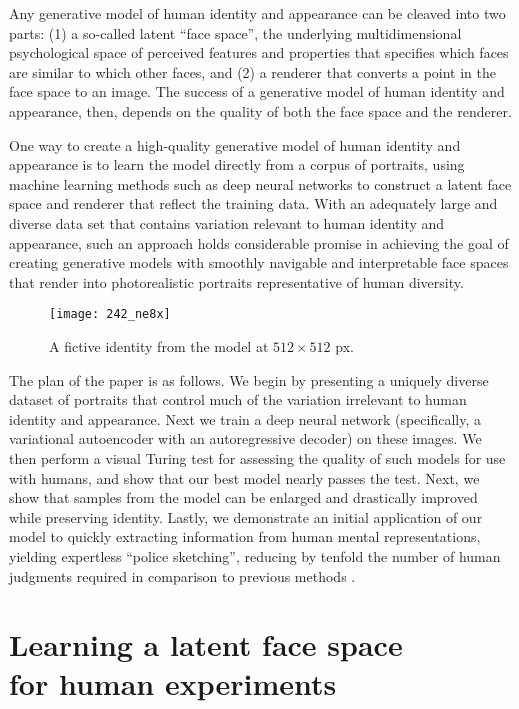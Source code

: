 \documentclass[10pt,letterpaper]{article}
\begin{document}
Any generative model of human identity and appearance can be cleaved into two parts: (1) a so-called latent ``face space'', the underlying  multidimensional psychological space of perceived features and properties that specifies which faces are similar to which other faces, and (2) a renderer that converts a point in the face space to an image. The success of a generative model of human identity and appearance, then, depends on the quality of both the face space and the renderer. 

One way to create a high-quality generative model of human identity and appearance is to learn the model directly from a corpus of portraits, using machine learning methods such as deep neural networks to construct a latent face space and renderer that reflect the training data. With an adequately large and diverse data set that contains variation relevant to human identity and appearance, such an approach holds considerable promise in achieving the goal of creating generative models with smoothly navigable and interpretable face spaces that render into photorealistic portraits representative of human diversity.


\begin{figure}
    \centering
    \texttt{[image: 242\_ne8x]}
    \vspace{-2mm}
    \caption{\label{242_ne8x}A fictive identity from the model  at $512\times512$ px.}
    \vspace{-5mm}
\end{figure}


The plan of the paper is as follows. We begin by presenting a uniquely diverse dataset of portraits that control much of the variation irrelevant to human identity and appearance. Next we train a deep neural network (specifically, a variational autoencoder with an autoregressive decoder) on these images. We then perform a visual Turing test for assessing the quality of such models for use with humans, and show that our best model nearly passes the test. Next, we show that samples from the model can be enlarged and drastically improved while preserving identity. Lastly, we demonstrate an initial application of our model to quickly extracting information from human mental representations, yielding expertless ``police sketching'', reducing by tenfold the number of human judgments required in comparison to previous methods .

\section{Learning a latent face space \nopagebreak\\ for human experiments}
\end{document}
